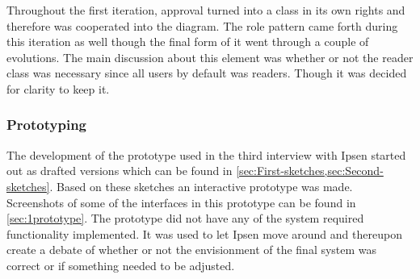 Throughout the first iteration, approval turned into a class in its own rights and therefore was cooperated into the diagram.
The role pattern came forth during this iteration as well though the final form of it went through a couple of evolutions.
The main discussion about this element was whether or not the reader class was necessary since all users by default was readers. 
Though it was decided for clarity to keep it.

\subsubsection*{Prototyping}
The development of the prototype used in the third interview with Ipsen started out as drafted versions which can be found in \cref{sec:First-sketches,sec:Second-sketches}.
Based on these sketches an interactive prototype was made. 
Screenshots of some of the interfaces in this prototype can be found in \cref{sec:1prototype}.
The prototype did not have any of the system required functionality implemented.
It was used to let Ipsen move around and thereupon create a debate of whether or not the envisionment of the final system was correct or if something needed to be adjusted.
